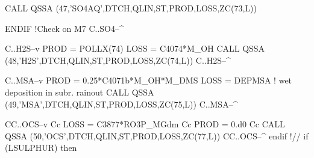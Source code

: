                 CALL QSSA (47,'SO4AQ',DTCH,QLIN,ST,PROD,LOSS,ZC(73,L))

             ENDIF              !Check on M7
C..SO4--^

C..H2S--v
             PROD = POLLX(74)
             LOSS = C4074*M_OH
             CALL QSSA (48,'H2S',DTCH,QLIN,ST,PROD,LOSS,ZC(74,L))
C..H2S--^


C..MSA--v
             PROD = 0.25*C4071b*M_OH*M_DMS
             LOSS = DEPMSA      ! wet deposition in subr. rainout
             CALL QSSA (49,'MSA',DTCH,QLIN,ST,PROD,LOSS,ZC(75,L))
C..MSA--^


CC..OCS--v
Cc          LOSS = C3877*RO3P_MGdm
Cc          PROD = 0.d0
Cc          CALL QSSA (50,'OCS',DTCH,QLIN,ST,PROD,LOSS,ZC(77,L))
CC..OCS--^
          endif !// if (LSULPHUR) then
